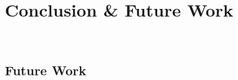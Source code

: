 \section{Conclusion \& Future Work}~\label{sec:conclusion}
\subsection{Future Work}~\label{subsec:future}

